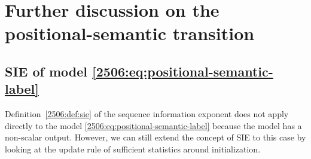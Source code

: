 \section{Further discussion on the positional-semantic transition} \label{2506:app:further-positional-semantic}



\subsection{SIE of model \texorpdfstring{\eqref{2506:eq:positional-semantic-label}}{\ref{2506:eq:positional-semantic-label}}}
Definition~\ref{2506:def:sie} of the sequence information exponent does not apply directly to the model \eqref{2506:eq:positional-semantic-label} because the model has a non-scalar output. However, we can still extend the concept of SIE to this case by looking at the update rule of sufficient statistics around initialization.

